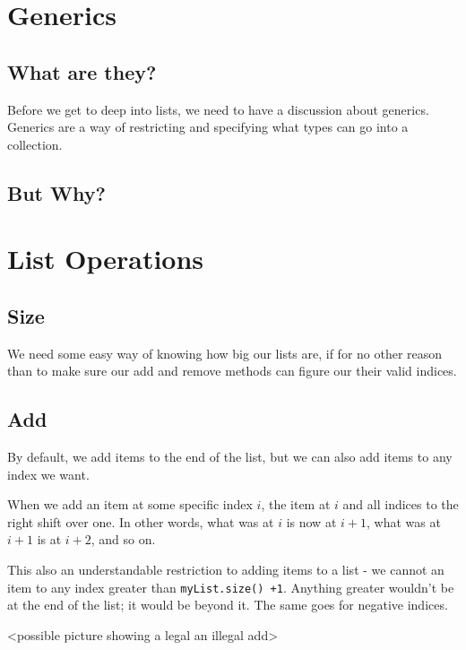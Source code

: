 \section{Generics}

\subsection{What are they?}


Before we get to deep into lists, we need to have a discussion about generics. Generics are a way of restricting and specifying what types can go into a collection.

\subsection{But Why?}




\section{List Operations}


\subsection{Size} We need some easy way of knowing how big our lists are, if for no other reason than to make sure our  add and remove methods can figure our their valid indices.


\subsection{Add}  By default, we add items to the end of the list, but we can also add items to any index we want.

When we add an item at some specific index $ i $, the item at $ i $ and all indices to the right shift over one.  In other words, what was at $ i $ is now at $ i+1 $, what was at $ i+1 $ is at $ i+2 $,  and so on.

This also an understandable restriction to adding items to a list -  we cannot an item to any index greater than \texttt{myList.size() +1}.   Anything greater wouldn't be at the end of the list; it would be beyond it.  The same goes for negative indices.
 
<possible picture showing a legal an illegal add>


